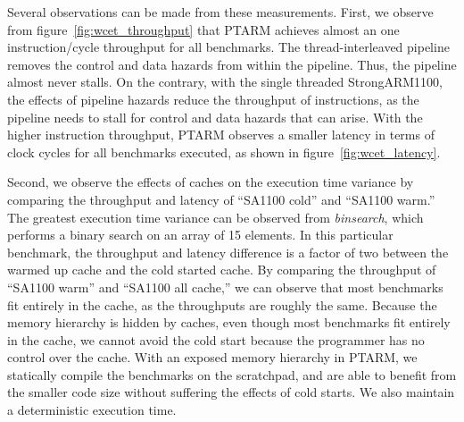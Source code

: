 Several observations can be made from these measurements. 
First, we observe from figure~\ref{fig:wcet_throughput} that PTARM achieves almost an one instruction/cycle throughput for all benchmarks.
The thread-interleaved pipeline removes the control and data hazards from within the pipeline. 
Thus, the pipeline almost never stalls.
On the contrary, with the single threaded StrongARM1100, the effects of pipeline hazards reduce the throughput of instructions, as the pipeline needs to stall for control and data hazards that can arise. 
With the higher instruction throughput, PTARM observes a smaller latency in terms of clock cycles for all benchmarks executed, as shown in figure~\ref{fig:wcet_latency}.
  
Second, we observe the effects of caches on the execution time variance by comparing the throughput and latency of ``SA1100 cold'' and ``SA1100 warm.'' 
The greatest execution time variance can be observed from \emph{binsearch}, which performs a binary search on an array of 15 elements. 
In this particular benchmark, the throughput and latency difference is a factor of two between the warmed up cache and the cold started cache.
By comparing the throughput of ``SA1100 warm'' and ``SA1100 all cache,'' we can observe that most benchmarks fit entirely in the cache, as the throughputs are roughly the same. 
Because the memory hierarchy is hidden by caches, even though most benchmarks fit entirely in the cache, we cannot avoid the cold start because the programmer has no control over the cache. 
With an exposed memory hierarchy in PTARM, we statically compile the benchmarks on the scratchpad, and are able to benefit from the smaller code size without suffering the effects of cold starts.
We also maintain a deterministic execution time. 

